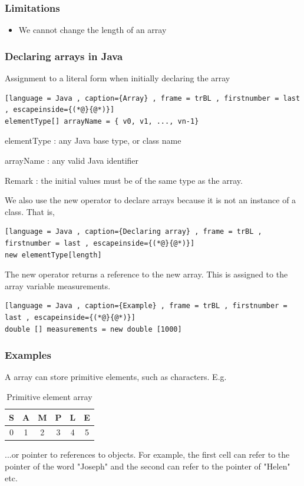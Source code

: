 \documentclass[a4paper]{article}
\theoremstyle{plain}
\theoremstyle{definition}
\theoremstyle{remark}
\begin{document}
\subsubsection{Limitations}
\begin{itemize}
	\item We cannot change the length of an array
\end{itemize}
\subsubsection{Declaring arrays in Java}
Assignment to a literal form when initially declaring the array
\begin{lstlisting}[language = Java , caption={Array} , frame = trBL , firstnumber = last , escapeinside={(*@}{@*)}]
elementType[] arrayName = { v0, v1, ..., vn-1}
\end{lstlisting}
elementType : any Java base type, or class name

arrayName : any valid Java identifier

Remark : the initial values must be of the same type as the array.

We also use the new operator to declare arrays because it is not an instance of a class. That is,
\begin{lstlisting}[language = Java , caption={Declaring array} , frame = trBL , firstnumber = last , escapeinside={(*@}{@*)}]
new elementType[length]
\end{lstlisting}
The new operator returns a reference to the new array. This is assigned to the array variable measurements.
\begin{lstlisting}[language = Java , caption={Example} , frame = trBL , firstnumber = last , escapeinside={(*@}{@*)}]
double [] measurements = new double [1000]
\end{lstlisting}
\subsubsection{Examples}
A array can store primitive elements, such as characters. E.g.
\begin{table}[H]
	\centering
	\caption{Primitive element array}
	\label{tab:label}
	\begin{tabular}{|c|c|c|c|c|c|}
	\hline
	S & A  & M  & P  & L & E  \\
	\hline
	0 & 1 & 2 & 3 & 4 & 5 \\
	\hline
	\end{tabular}
\end{table}
...or pointer to references to objects. For example, the first cell can refer to the pointer of the word "Joseph" and the second can refer to the pointer of "Helen" etc.
\end{document}
